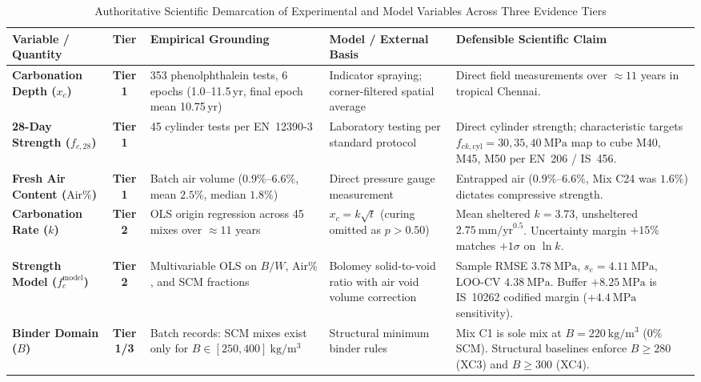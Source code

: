 \documentclass[journal]{IEEEtran}
\begin{document}
\begin{table}[!t]
\caption{Authoritative Scientific Demarcation of Experimental and Model Variables Across Three Evidence Tiers}
\label{tab:evidence_hierarchy}
\centering
\scriptsize
\renewcommand{\arraystretch}{0.65}
\setlength{\tabcolsep}{3.0pt}
\begin{tabularx}{\textwidth}{L{2.2cm} c L{2.8cm} L{2.8cm} >{\raggedright\arraybackslash}X}
\toprule
\textbf{Variable / Quantity} & \textbf{Tier} & \textbf{Empirical Grounding} & \textbf{Model / External Basis} & \textbf{Defensible Scientific Claim} \\
\midrule
\textbf{Carbonation Depth ($x_c$)} & \textbf{Tier 1} & 353 phenolphthalein tests, 6 epochs (1.0--11.5\,yr, final epoch mean 10.75\,yr) & Indicator spraying; corner-filtered spatial average \cite{hule2024} & Direct field measurements over $\approx 11$ years in tropical Chennai. \\
\addlinespace[1pt]
\textbf{28-Day Strength ($f_{c,28}$)} & \textbf{Tier 1} & 45 cylinder tests per EN~12390-3 & Laboratory testing per standard protocol & Direct cylinder strength; characteristic targets $f_{ck,\mathrm{cyl}} = 30, 35, 40\ \mathrm{MPa}$ map to cube M40, M45, M50 per EN~206 / IS~456. \\
\addlinespace[1pt]
\textbf{Fresh Air Content ($\mathrm{Air}\%$)} & \textbf{Tier 1} & Batch air volume ($0.9\%\text{--}6.6\%$, mean $2.5\%$, median $1.8\%$) & Direct pressure gauge measurement & Entrapped air ($0.9\%\text{--}6.6\%$, Mix C24 was $1.6\%$) dictates compressive strength. \\
\addlinespace[1pt]
\textbf{Carbonation Rate ($k$)} & \textbf{Tier 2} & OLS origin regression across 45 mixes over $\approx 11$ years & $x_c = k\sqrt{t}$ (curing omitted as $p > 0.50$) & Mean sheltered $k = 3.73$, unsheltered $2.75\ \mathrm{mm/yr}^{0.5}$. Uncertainty margin $+15\%$ matches $+1\sigma$ on $\ln k$. \\
\addlinespace[1pt]
\textbf{Strength Model ($f_c^{\mathrm{model}}$)} & \textbf{Tier 2} & Multivariable OLS on $B/W$, $\mathrm{Air}\%$, and SCM fractions & Bolomey solid-to-void ratio with air void volume correction & Sample RMSE $3.78\ \mathrm{MPa}$, $s_e = 4.11\ \mathrm{MPa}$, LOO-CV $4.38\ \mathrm{MPa}$. Buffer $+8.25\ \mathrm{MPa}$ is IS~10262 codified margin ($+4.4\ \mathrm{MPa}$ sensitivity). \\
\addlinespace[1pt]
\textbf{Binder Domain ($B$)} & \textbf{Tier 1/3} & Batch records: SCM mixes exist only for $B \in [250, 400]\ \mathrm{kg/m^3}$ & Structural minimum binder rules & Mix C1 is sole mix at $B = 220\ \mathrm{kg/m^3}$ ($0\%$ SCM). Structural baselines enforce $B \ge 280$ (XC3) and $B \ge 300$ (XC4). \\

\end{tabularx}
\end{table}
\end{document}
